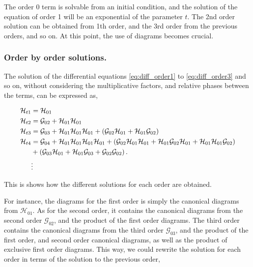 \documentclass[11pt,a4paper,twoside,pdf]{article}
\numberwithin{equation}{section}
\begin{document}
The order 0 term is solvable from an initial condition, and the solution of the 
equation of order 1 will be an exponential of the parameter $t$. The 2nd order 
solution can be obtained from 1th order, and the 3rd order from the previous orders, 
and so on. At this point, the use of diagrams becomes crucial.


\subsubsection{Order by order solutions.} \label{sec:orderbyorder_solutions}

The solution of the differential equations \eqref{eq:diff_order1} to \eqref{eq:diff_order3} 
and so on, without considering the multiplicative factors, and relative phases between
the terms, can be expressed as,

\begin{align}
    \mathcal{H}_{t1} & = \mathcal{H}_{01} \\
    \mathcal{H}_{t2} & = \mathcal{G}_{02} + \mathcal{H}_{01} 
    \mathcal{H}_{01}\\
    \mathcal{H}_{t3} & = \mathcal{G}_{03} + \mathcal{H}_{01} \mathcal{H}_{01}
    \mathcal{H}_{01} + \left( \mathcal{G}_{02} \mathcal{H}_{01} + 
    \mathcal{H}_{01} \mathcal{G}_{02} \right)\\
    \mathcal{H}_{t4} & = \mathcal{G}_{04} + \mathcal{H}_{01} \mathcal{H}_{01}
    \mathcal{H}_{01} \mathcal{H}_{01} + \left( \mathcal{G}_{02} 
    \mathcal{H}_{01} \mathcal{H}_{01} +  \mathcal{H}_{01} \mathcal{G}_{02}
    \mathcal{H}_{01} + \mathcal{H}_{01} \mathcal{H}_{01} \mathcal{G}_{02} \right) \nonumber\\
    & + \left( \mathcal{G}_{03} \mathcal{H}_{01} + \mathcal{H}_{01} 
    \mathcal{G}_{03} + \mathcal{G}_{02}\mathcal{G}_{02} \right). \\
    &\vdots  \nonumber
\end{align}

This is shows how the different solutions for each order are obtained. 

For instance, the diagrams for the first order is simply the canonical diagrams from
$\mathcal{H}_{01}$. As for the second order, it contains the canonical diagrams from 
the second order $\mathcal{G}_{02}$, and the product of the first order diagrams. The 
third order contains the canonical diagrams from the third order $\mathcal{G}_{03}$,
and the product of the first order, and second order canonical diagrams, as well as the 
product of exclusive first order diagrams. This way, we could rewrite the solution for 
each order in terms of the solution to the previous order,
\end{document}
